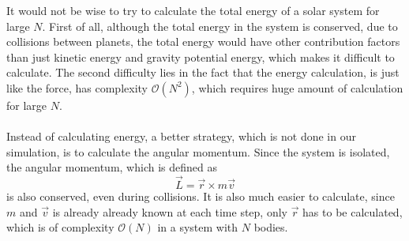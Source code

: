 It would not be wise to try to calculate the total energy of a solar system for large $N$. First of all, although the total energy in the system is conserved, due to collisions between planets, the total energy would have other contribution factors than just kinetic energy and gravity potential energy, which makes it difficult to calculate. The second difficulty lies in the fact that the energy calculation, is just like the force, has complexity $\mathcal{O}(N^2)$, which requires huge amount of calculation for large $N$.\\
\\
Instead of calculating energy, a better strategy, which is not done in our simulation, is to calculate the angular momentum. Since the system is isolated, the angular momentum, which is defined as 
\[\vec{L}=\vec{r}\times m\vec{v}\]
is also conserved, even during collisions. It is also much easier to calculate, since $m$ and $\vec{v}$ is already already known at each time step, only $\vec{r}$ has to be calculated, which is of complexity $\mathcal{O}(N)$ in a system with $N$ bodies.
